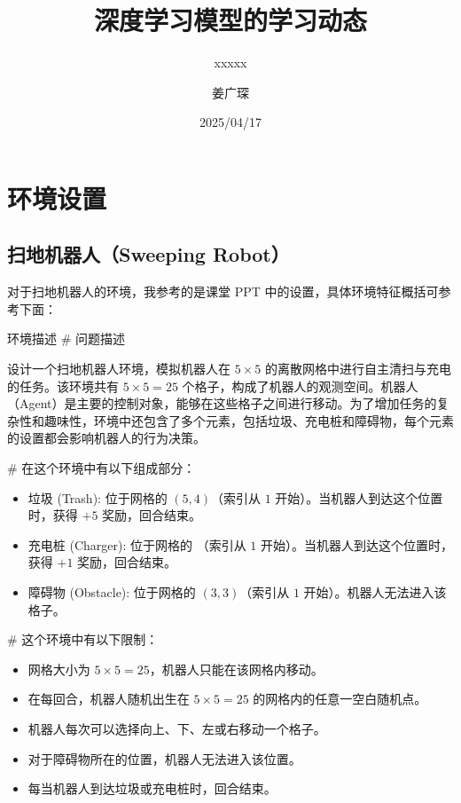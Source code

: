 \documentclass[citestyle=gb7714-2015, bibstyle=gb7714-2015,lang=cn,14pt,scheme=chinese]{elegantbook}
\title{深度学习模型的学习动态}
\subtitle{xxxxx}
\author{姜广琛}
\institute{西北工业大学}
\date{2025/04/17}
\begin{document}
\frontmatter

\tableofcontents

\mainmatter%

\chapter{环境设置}

\section{扫地机器人（Sweeping Robot）}

对于扫地机器人的环境，我参考的是课堂 PPT 中的设置，具体环境特征概括可参考下面：

\begin{definition*}{环境描述}
\# 问题描述

    设计一个扫地机器人环境，模拟机器人在 \(5 \times 5\) 的离散网格中进行自主清扫与充电的任务。该环境共有 \(5 \times 5 = 25\) 个格子，构成了机器人的观测空间。机器人（Agent）是主要的控制对象，能够在这些格子之间进行移动。为了增加任务的复杂性和趣味性，环境中还包含了多个元素，包括垃圾、充电桩和障碍物，每个元素的设置都会影响机器人的行为决策。

\# 在这个环境中有以下组成部分：
    \begin{itemize}
        \item 垃圾 (Trash): 位于网格的 \(\left( 5, 4 \right)\)（索引从 \(1\) 开始）。当机器人到达这个位置时，获得 \(+5\) 奖励，回合结束。
        \item 充电桩 (Charger): 位于网格的 （索引从 \(1\) 开始）。当机器人到达这个位置时，获得 \(+1\) 奖励，回合结束。
        \item 障碍物 (Obstacle): 位于网格的 \(\left( 3, 3 \right)\)（索引从 \(1\) 开始）。机器人无法进入该格子。
    \end{itemize}

\# 这个环境中有以下限制：
\begin{itemize}
    \item 网格大小为 \(5 \times 5 = 25\)，机器人只能在该网格内移动。
    \item 在每回合，机器人随机出生在 \(5 \times 5 = 25\) 的网格内的任意一空白随机点。
    \item 机器人每次可以选择向上、下、左或右移动一个格子。
    \item 对于障碍物所在的位置，机器人无法进入该位置。
    \item 每当机器人到达垃圾或充电桩时，回合结束。
\end{itemize}
\end{definition*}
\end{document}

